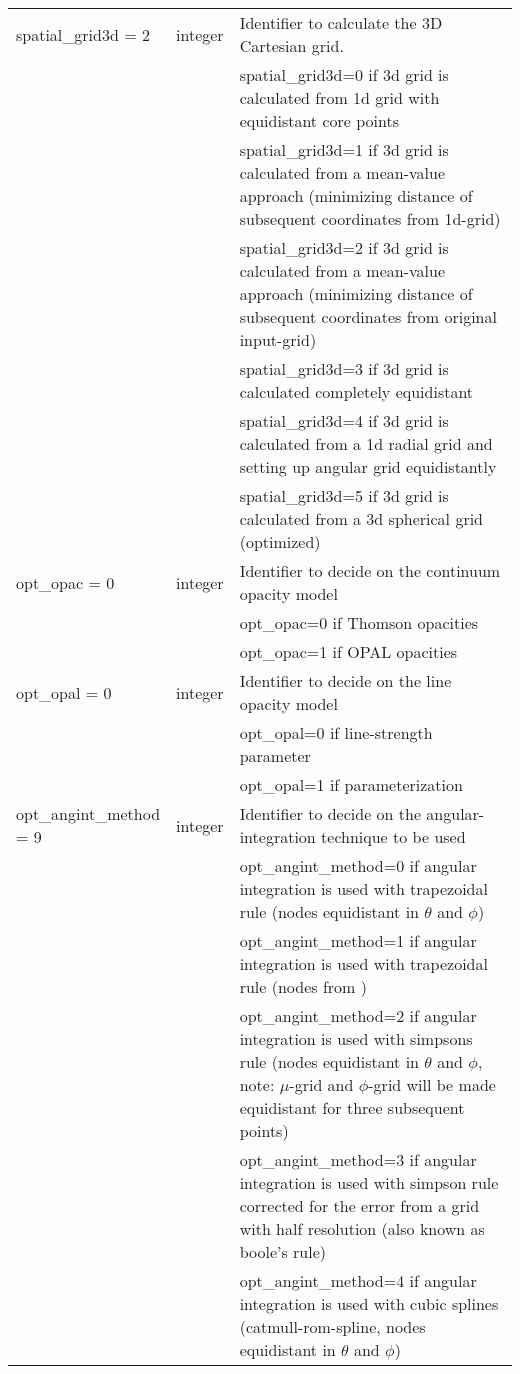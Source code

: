 \documentclass[10pt,a4paper]{article}
\begin{document}
\begin{footnotesize}
\begin{longtable}[h]{p{0.24\linewidth}p{0.07\linewidth}p{0.69\linewidth}}
%
spatial\_grid3d = 2 & integer & Identifier to calculate the 3D Cartesian grid. \\
& & spatial\_grid3d=0 if 3d grid is calculated from 1d grid with equidistant core points  \\
& & spatial\_grid3d=1 if 3d grid is calculated from a mean-value approach (minimizing distance of subsequent coordinates from 1d-grid) \\
& & spatial\_grid3d=2 if 3d grid is calculated from a mean-value approach  (minimizing distance of subsequent coordinates from original input-grid) \\
& & spatial\_grid3d=3 if 3d grid is calculated completely equidistant \\
& & spatial\_grid3d=4 if 3d grid is calculated from a 1d radial grid and setting up angular grid equidistantly \\
& & spatial\_grid3d=5 if 3d grid is calculated from a 3d spherical grid (optimized) \\
%
opt\_opac = 0 & integer & Identifier to decide on the continuum opacity model \\
 & & opt\_opac=0 if Thomson opacities \\
 & & opt\_opac=1 if OPAL opacities \\
%
opt\_opal = 0 & integer & Identifier to decide on the line opacity model \\
 & & opt\_opal=0 if line-strength parameter \\
 & & opt\_opal=1 if \cite{Hamann80} parameterization \\
%
opt\_angint\_method = 9 & integer & Identifier to decide on the angular-integration technique to be used \\
 & & opt\_angint\_method=0 if angular integration is used with trapezoidal rule (nodes equidistant in $\theta$ and $\phi$) \\
 & & opt\_angint\_method=1 if angular integration is used with trapezoidal rule (nodes from \cite{Lobel08}) \\
 & &  opt\_angint\_method=2 if angular integration is used with simpsons rule (nodes equidistant in $\theta$ and $\phi$, note: $\mu$-grid and $\phi$-grid will be made equidistant for three subsequent points) \\
 & & opt\_angint\_method=3 if angular integration is used with simpson rule corrected for the error from a grid with half resolution (also known as boole's rule) \\
 & & opt\_angint\_method=4 if angular integration is used with cubic splines (catmull-rom-spline, nodes equidistant in $\theta$ and $\phi$) \\

\end{longtable}
\end{footnotesize}
\end{document}
